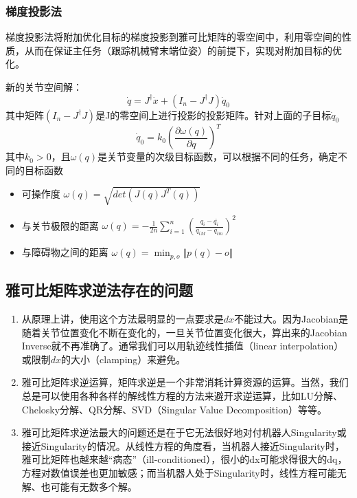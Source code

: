 \subsubsection{梯度投影法}
梯度投影法将附加优化目标的梯度投影到雅可比矩阵的零空间中，利用零空间的性质，从而在保证主任务（跟踪机械臂末端位姿）的前提下，实现对附加目标的优化。
\begin{theorembox}
	新的关节空间解：
	\begin{equation*}
  \dot{q} = J^{\dagger}\dot{x} +(I_n - J^{\dagger}J)\dot{q}_0
\end{equation*}
其中矩阵$(I_n - J^{\dagger}J)$是J的零空间上进行投影的投影矩阵。针对上面的子目标$\dot{q}_0$
\begin{equation*}
  \dot{q}_0 = k_0\left(\frac{\partial \omega(q)}{\partial q}\right)^T
\end{equation*}
其中$k_0 > 0$，且$\omega(q)$是关节变量的次级目标函数，可以根据不同的任务，确定不同的目标函数
\begin{itemize}
	\item 可操作度 $\omega (q) = \sqrt{det(J(q)J^T(q))}$
	\item 与关节极限的距离 $\omega (q) = -\frac{1}{2n}\sum^n_{i=1}\left(\frac{q_i - \bar{q_i}}{q_{iM} - q_{im}}\right)^2$
	\item 与障碍物之间的距离 $\omega (q) = \min_{p,o}\Vert p(q) - o \Vert$
\end{itemize}
\end{theorembox}
\subsection{雅可比矩阵求逆法存在的问题}
\begin{enumerate}
  \item 从原理上讲，使用这个方法最明显的一点要求是$dx$不能过大。因为Jacobian是随着关节位置变化不断在变化的，一旦关节位置变化很大，算出来的Jacobian Inverse就不再准确了。通常我们可以用轨迹线性插值（linear interpolation）或限制$dx$的大小（clamping）来避免。
  \item 雅可比矩阵求逆运算，矩阵求逆是一个非常消耗计算资源的运算。当然，我们总是可以使用各种各样的解线性方程的方法来避开求逆运算，比如LU分解、Chelosky分解、QR分解、SVD（Singular Value Decomposition）等等。
  \item 雅可比矩阵求逆法最大的问题还是在于它无法很好地对付机器人Singularity或接近Singularity的情况。从线性方程的角度看，当机器人接近Singularity时，雅可比矩阵也越来越“病态”（ill-conditioned），很小的dx可能求得很大的dq，方程对数值误差也更加敏感；而当机器人处于Singularity时，线性方程可能无解、也可能有无数多个解。
\end{enumerate}
